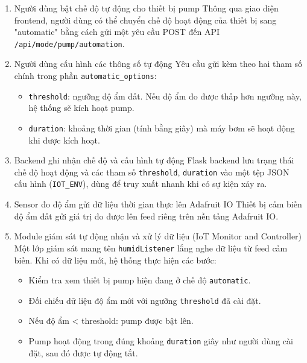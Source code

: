 \begin{enumerate}
    \item Người dùng bật chế độ tự động cho thiết bị pump \newline
    Thông qua giao diện frontend, người dùng có thể chuyển chế độ hoạt động của thiết bị sang "automatic" bằng cách gửi một yêu cầu POST đến API \texttt{/api/mode/pump/automation}.
    \item Người dùng cấu hình các thông số tự động \newline
    Yêu cầu gửi kèm theo hai tham số chính trong phần \texttt{automatic\_options}:
    \begin{itemize}
        \item \texttt{threshold}: ngưỡng độ ẩm đất. Nếu độ ẩm đo được thấp hơn ngưỡng này, hệ thống sẽ kích hoạt pump.
        \item \texttt{duration}: khoảng thời gian (tính bằng giây) mà máy bơm sẽ hoạt động khi được kích hoạt.
    \end{itemize}

    \item Backend ghi nhận chế độ và cấu hình tự động \newline
    Flask backend lưu trạng thái chế độ hoạt động và các tham số \texttt{threshold}, \texttt{duration} vào một tệp JSON cấu hình (\texttt{IOT\_ENV}), dùng để truy xuất nhanh khi có sự kiện xảy ra.

    \item Sensor đo độ ẩm gửi dữ liệu thời gian thực lên Adafruit IO \newline
    Thiết bị cảm biến độ ẩm đất gửi giá trị đo được lên feed riêng trên nền tảng Adafruit IO.

    \item Module giám sát tự động nhận và xử lý dữ liệu (IoT Monitor and Controller)
    Một lớp giám sát mang tên \texttt{humidListener} lắng nghe dữ liệu từ feed cảm biến. Khi có dữ liệu mới, hệ thống thực hiện các bước:
    \begin{itemize}
        \item Kiểm tra xem thiết bị pump hiện đang ở chế độ \texttt{automatic}.
        \item Đối chiếu dữ liệu độ ẩm mới với ngưỡng \texttt{threshold} đã cài đặt.
        \item Nếu độ ẩm < threshold: pump được bật lên.
        \item Pump hoạt động trong đúng khoảng \texttt{duration} giây như người dùng cài đặt, sau đó được tự động tắt.
    \end{itemize}
\end{enumerate}

